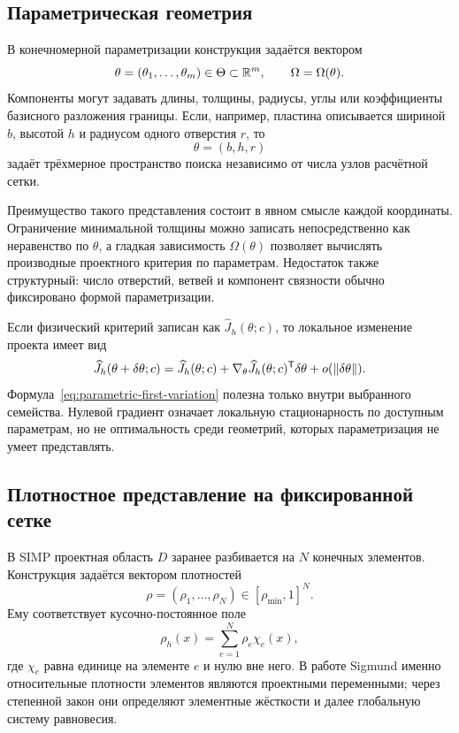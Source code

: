 \subsection{Параметрическая геометрия}

В конечномерной параметризации конструкция задаётся вектором
\begin{equation}
 \theta=(\theta_1,\ldots,\theta_m)\in\Theta\subset\mathbb{R}^m,
 \qquad
 \Omega=\Omega(\theta).
\end{equation}
Компоненты могут задавать длины, толщины, радиусы, углы или коэффициенты базисного разложения границы. Если, например, пластина описывается шириной $b$, высотой $h$ и радиусом одного отверстия $r$, то
\begin{equation}
 \theta=(b,h,r)
\end{equation}
задаёт трёхмерное пространство поиска независимо от числа узлов расчётной сетки.

Преимущество такого представления состоит в явном смысле каждой координаты. Ограничение минимальной толщины можно записать непосредственно как неравенство по $\theta$, а гладкая зависимость $\Omega(\theta)$ позволяет вычислять производные проектного критерия по параметрам. Недостаток также структурный: число отверстий, ветвей и компонент связности обычно фиксировано формой параметризации.

Если физический критерий записан как $\widehat J_h(\theta;c)$, то локальное изменение проекта имеет вид
\begin{equation}
\label{eq:parametric-first-variation}
 \widehat J_h(\theta+\delta\theta;c)
 =
 \widehat J_h(\theta;c)
 +
 \nabla_\theta \widehat J_h(\theta;c)^{\mathsf{T}}\delta\theta
 +o(\|\delta\theta\|).
\end{equation}
Формула~\eqref{eq:parametric-first-variation} полезна только внутри выбранного семейства. Нулевой градиент означает локальную стационарность по доступным параметрам, но не оптимальность среди геометрий, которых параметризация не умеет представлять.

\subsection{Плотностное представление на фиксированной сетке}

В SIMP проектная область $D$ заранее разбивается на $N$ конечных элементов. Конструкция задаётся вектором плотностей
\begin{equation}
 \rho=(\rho_1,\ldots,\rho_N)
 \in
 [\rho_{\min},1]^N.
\end{equation}
Ему соответствует кусочно-постоянное поле
\begin{equation}
 \rho_h(x)
 =
 \sum_{e=1}^{N}\rho_e\chi_e(x),
\end{equation}
где $\chi_e$ равна единице на элементе $e$ и нулю вне него. В работе Sigmund именно относительные плотности элементов являются проектными переменными; через степенной закон они определяют элементные жёсткости и далее глобальную систему равновесия.

